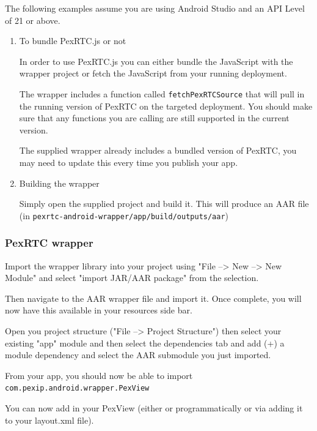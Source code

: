 \documentclass[a4paper,11pt]{article}
\begin{document}
The following examples assume you are using Android Studio and an API
Level of 21 or above.

\begin{enumerate}
\item To bundle PexRTC.js or not
\label{sec:org319e19d}

In order to use PexRTC.js you can either bundle the JavaScript with the wrapper project or fetch the JavaScript from your running deployment.

The wrapper includes a function called \texttt{fetchPexRTCSource} that will
pull in the running version of PexRTC on the targeted deployment.
You should make sure that any functions you are calling are still
supported in the current version.

The supplied wrapper already includes a bundled version of PexRTC, you
may need to update this every time you publish your app.

\item Building the wrapper
\label{sec:orgff7cd5f}

Simply open the supplied project and build it.  This will produce an
AAR file (in \texttt{pexrtc-android-wrapper/app/build/outputs/aar})
\end{enumerate}

\subsubsection{PexRTC wrapper}
\label{sec:org97e9792}

Import the wrapper library into your project using "File --> New -->
New Module" and select "import JAR/AAR package" from the selection.

Then navigate to the AAR wrapper file and import it.  Once complete,
you will now have this available in your resources side bar.

Open you project structure ("File --> Project Structure") then select
your existing "app" module and then select the dependencies tab and
add (+) a module dependency and select the AAR submodule you just
imported.

From your app, you should now be able to import
\texttt{com.pexip.android.wrapper.PexView} 

You can now add in your PexView (either or programmatically or via
adding it to your layout.xml file).
\end{document}
